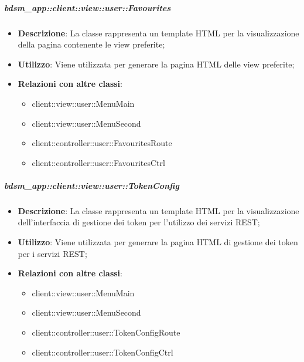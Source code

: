 		\subparagraph{bdsm\_app::client::view::user::Favourites} %
		\label{subp:bdsm_app_client_view_user_favourites}
			\begin{itemize}
				\item \textbf{Descrizione}: La classe rappresenta un template HTML per la visualizzazione della pagina contenente le view preferite;
				\item \textbf{Utilizzo}: Viene utilizzata per generare la pagina HTML delle view preferite;
				\item \textbf{Relazioni con altre classi}:
					\begin{itemize}
						\item client::view::user::MenuMain
						\item client::view::user::MenuSecond
						\item client::controller::user::FavouritesRoute
						\item client::controller::user::FavouritesCtrl
					\end{itemize}
			\end{itemize}

		\subparagraph{bdsm\_app::client::view::user::TokenConfig} %
		\label{subp:bdsm_app_client_view_user_tokenconfig}
			\begin{itemize}
				\item \textbf{Descrizione}: La classe rappresenta un template HTML per la visualizzazione dell'interfaccia di gestione dei token per l'utilizzo dei servizi REST;
				\item \textbf{Utilizzo}: Viene utilizzata per generare la pagina HTML di gestione dei token per i servizi REST;
				\item \textbf{Relazioni con altre classi}:
					\begin{itemize}
						\item client::view::user::MenuMain
						\item client::view::user::MenuSecond
						\item client::controller::user::TokenConfigRoute
						\item client::controller::user::TokenConfigCtrl
					\end{itemize}
			\end{itemize}

